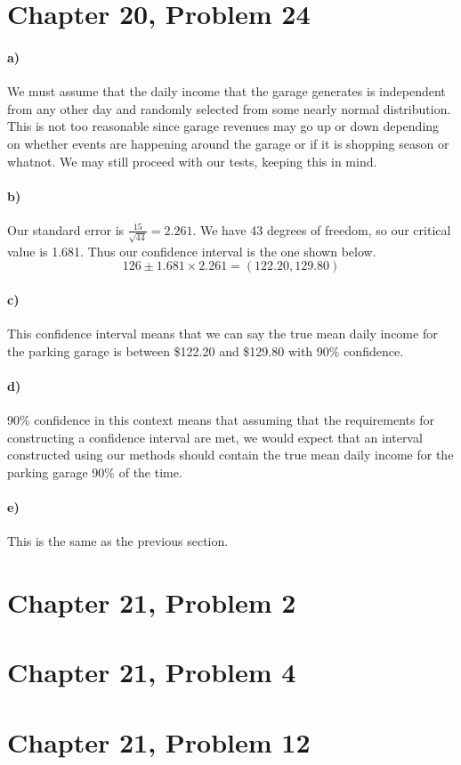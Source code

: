 \documentclass[12pt]{article}
\begin{document}
\section*{Chapter 20, Problem 24}

\paragraph{a)}

We must assume that the daily income that the garage generates is independent from any other day and randomly selected
from some nearly normal distribution. This is not too reasonable since garage revenues may go up or down depending on
whether events are happening around the garage or if it is shopping season or whatnot. We may still proceed with our tests,
keeping this in mind.

\paragraph{b)}

Our standard error is \(\frac{15}{\sqrt{44}}=2.261\). We have 43 degrees of freedom, so our critical value is 1.681. Thus
our confidence interval is the one shown below.
\[126\pm1.681\times2.261=(122.20,129.80)\]

\paragraph{c)}

This confidence interval means that we can say the true mean daily income for the parking garage is between \$122.20
and \$129.80 with 90\% confidence.

\paragraph{d)}

90\% confidence in this context means that assuming that the requirements for constructing a confidence interval are met,
we would expect that an interval constructed using our methods should contain the true mean daily income for the parking
garage 90\% of the time.

\paragraph{e)}

This is the same as the previous section.

\section*{Chapter 21, Problem 2}

\section*{Chapter 21, Problem 4}

\section*{Chapter 21, Problem 12}
\end{document}
